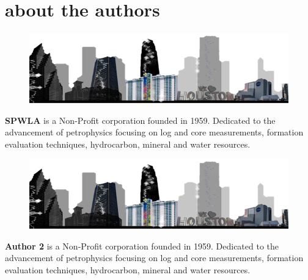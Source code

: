 \documentclass[10pt,twocolumn,twoside]{article}
\begin{document}
\section{about the authors}
\setlength\intextsep{0pt}
\begin{figure}
	\includegraphics[width=1.0\linewidth]{SPWLA-2023-Logo.png}
	\vspace{0.03in}
\end{figure}
\textbf{SPWLA} is a Non-Profit corporation founded in 1959. Dedicated to the advancement of petrophysics focusing on log and core measurements, formation evaluation techniques, hydrocarbon, mineral and water resources.

\begin{figure}
	\includegraphics[width=1.0\linewidth]{SPWLA-2023-Logo.png}
	\vspace{0.03in}
\end{figure}
\textbf{Author 2} is a Non-Profit corporation founded in 1959. Dedicated to the advancement of petrophysics focusing on log and core measurements, formation evaluation techniques, hydrocarbon, mineral and water resources.
\end{document}
